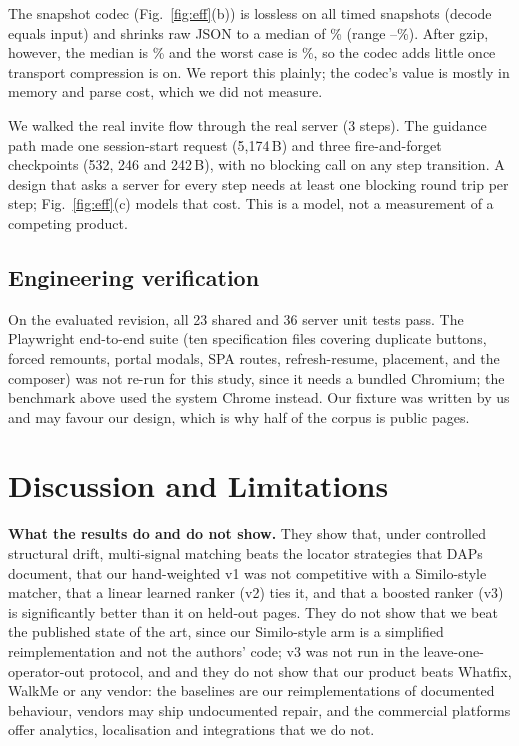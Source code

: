 \documentclass[conference]{IEEEtran}
\begin{document}
The snapshot codec (Fig.~\ref{fig:eff}(b)) is lossless on all \nTimed{} timed snapshots (decode equals input) and shrinks raw JSON to a median of \codecMedian\% (range \codecBest--\codecWorst\%). After gzip, however, the median is \gzMedian\% and the worst case is \gzWorst\%, so the codec adds little once transport compression is on. We report this plainly; the codec's value is mostly in memory and parse cost, which we did not measure.

We walked the real invite flow through the real server (3 steps). The guidance path made one session-start request (5{,}174\,B) and three fire-and-forget checkpoints (532, 246 and 242\,B), with no blocking call on any step transition. A design that asks a server for every step needs at least one blocking round trip per step; Fig.~\ref{fig:eff}(c) models that cost. This is a model, not a measurement of a competing product.

\subsection{Engineering verification}
On the evaluated revision, all 23 shared and 36 server unit tests pass. The Playwright end-to-end suite (ten specification files covering duplicate buttons, forced remounts, portal modals, SPA routes, refresh-resume, placement, and the composer) was not re-run for this study, since it needs a bundled Chromium; the benchmark above used the system Chrome instead. Our fixture was written by us and may favour our design, which is why half of the corpus is public pages.

\section{Discussion and Limitations}\label{sec:disc}
\textbf{What the results do and do not show.} They show that, under controlled structural drift, multi-signal matching beats the locator strategies that DAPs document, that our hand-weighted v1 was not competitive with a Similo-style matcher, that a linear learned ranker (v2) ties it, and that a boosted ranker (v3) is significantly better than it on held-out pages. They do not show that we beat the published state of the art, since our Similo-style arm is a simplified reimplementation and not the authors' code; v3 was not run in the leave-one-operator-out protocol, and and they do not show that our product beats Whatfix, WalkMe or any vendor: the baselines are our reimplementations of documented behaviour, vendors may ship undocumented repair, and the commercial platforms offer analytics, localisation and integrations that we do not.
\end{document}
